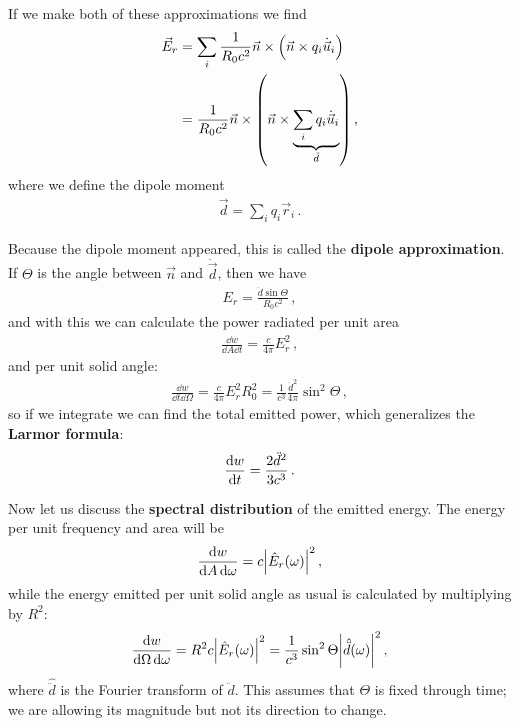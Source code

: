 \documentclass[main.tex]{subfiles}
\begin{document}
If we make both of these approximations we find 
%
\begin{align}
\vec{E}_r &= \sum _{i} \frac{1}{R_0 c^2} \vec{n} \times \qty(\vec{n} \times q_i \dot{\vec{u}}_i)  \\
&= \frac{1}{R_0 c^2} \vec{n} \times \qty(\vec{n} \times \underbrace{\sum _{i} q_i \dot{\vec{u}}_i}_{ \ddot{d}})
\,,
\end{align}
%
where we define the dipole moment 
%
\begin{align}
\vec{d} = \sum _{i} q_i \vec{r}_i
\,.
\end{align}

Because the dipole moment appeared, this is called the \textbf{dipole approximation}. 
If \(\Theta \) is the angle between \(\vec{n}\) and \(\ddot{\vec{d}}\), then we have 
%
\begin{align}
E_r = \frac{ \ddot{d}   \sin \Theta }{R_0 c^2}
\,,
\end{align}
%
and with this we can calculate the power radiated per unit area 
%
\begin{align}
\frac{ \dd{w}}{ \dd{A} \dd{t}} = \frac{c}{4 \pi } E_r^2
\,,
\end{align}
%
and per unit solid angle: 
%
\begin{align}
\frac{ \dd{w}}{ \dd{t} \dd{\Omega }}= \frac{c}{4 \pi } E_r^2 R_0^2
= \frac{1}{c^3} \frac{ \ddot{d}^2}{4 \pi } \sin^2\Theta 
\,,
\end{align}
%
so if we integrate we can find the total emitted power, which generalizes the \textbf{Larmor formula}: 
%
\begin{align}
\dv{w}{t}= \frac{2 \ddot{d}^2}{3 c^3}
\,.
\end{align}

Now let us discuss the \textbf{spectral distribution} of the emitted energy. The energy per unit frequency and area will be 
%
\begin{align}
\frac{ \dd{w}}{ \dd{A} \dd{\omega }} = c \abs{\hat{E}_r(\omega )}^2
\,,
\end{align}
%
while the energy emitted per unit solid angle as usual is calculated by multiplying by \(R^2\): 
%
\begin{align}
\frac{ \dd{w}}{ \dd{\Omega } \dd{\omega }} = R^2 c \abs{\hat{E}_r (\omega )}^2 = \frac{1}{c^3} \sin^2\Theta \abs{ \hat{\ddot{d}} (\omega )}^2
\,,
\end{align}
%
where \(\hat{ \ddot{d} }\) is the Fourier transform of \(\ddot{d}\). 
This assumes that \(\Theta \) is fixed through time; we are allowing its magnitude but not its direction to change. 
\end{document}
